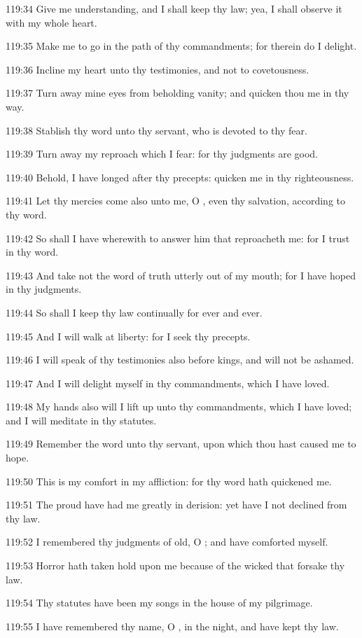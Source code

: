 119:34 Give me understanding, and I shall keep thy law; yea, I shall
observe it with my whole heart.

119:35 Make me to go in the path of thy commandments; for therein do I
delight.

119:36 Incline my heart unto thy testimonies, and not to covetousness.

119:37 Turn away mine eyes from beholding vanity; and quicken thou me
in thy way.

119:38 Stablish thy word unto thy servant, who is devoted to thy fear.

119:39 Turn away my reproach which I fear: for thy judgments are good.

119:40 Behold, I have longed after thy precepts: quicken me in thy
righteousness.

119:41 Let thy mercies come also unto me, O \LORD, even thy salvation,
according to thy word.

119:42 So shall I have wherewith to answer him that reproacheth me:
for I trust in thy word.

119:43 And take not the word of truth utterly out of my mouth; for I
have hoped in thy judgments.

119:44 So shall I keep thy law continually for ever and ever.

119:45 And I will walk at liberty: for I seek thy precepts.

119:46 I will speak of thy testimonies also before kings, and will not
be ashamed.

119:47 And I will delight myself in thy commandments, which I have
loved.

119:48 My hands also will I lift up unto thy commandments, which I
have loved; and I will meditate in thy statutes.

119:49 Remember the word unto thy servant, upon which thou hast caused
me to hope.

119:50 This is my comfort in my affliction: for thy word hath
quickened me.

119:51 The proud have had me greatly in derision: yet have I not
declined from thy law.

119:52 I remembered thy judgments of old, O \LORD; and have comforted
myself.

119:53 Horror hath taken hold upon me because of the wicked that
forsake thy law.

119:54 Thy statutes have been my songs in the house of my pilgrimage.

119:55 I have remembered thy name, O \LORD, in the night, and have kept
thy law.

